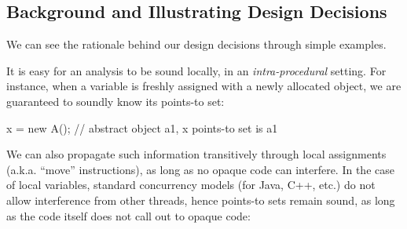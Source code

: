 







%


\subsection{Background and Illustrating Design Decisions}
\label{sec:principles}

We can see the rationale behind our design decisions through simple
examples.

It is easy for an analysis to be sound locally, in an
\emph{intra-procedural} setting. For instance, when a
variable is freshly assigned with a newly allocated object,
we are guaranteed to soundly know its points-to set:

\vspace{-3mm}\begin{minipage}[l]{5.1in}
\begin{javacodeNoLines}
x = new A();  // abstract object a1, x points-to set is {a1}
\end{javacodeNoLines}
\end{minipage}

We can also propagate such information transitively through local
assignments (a.k.a. ``move'' instructions), as long as no opaque code
can interfere. In the case of local variables, standard concurrency
models (for Java, C++, etc.) do not allow interference from other
threads, hence points-to sets remain sound, as long as the code
itself does not call out to opaque code:

